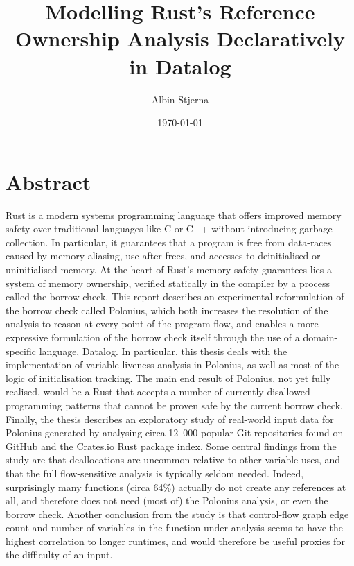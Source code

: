 \documentclass[11pt,a4paper,twoside,openany]{report}
\author{Albin Stjerna}
\date{\today}
\title{Modelling Rust's Reference Ownership Analysis Declaratively in Datalog}
\begin{document}



\maketitle

\section*{Abstract}

Rust is a modern systems programming language that offers improved memory safety
over traditional languages like C or C++ without introducing garbage collection.
In particular, it guarantees that a program is free from data-races caused by
memory-aliasing, use-after-frees, and accesses to deinitialised or uninitialised
memory. At the heart of Rust's memory safety guarantees lies a system of memory
ownership, verified statically in the compiler by a process called the borrow
check. This report describes an experimental reformulation of the borrow check
called Polonius, which both increases the resolution of the analysis to reason
at every point of the program flow, and enables a more expressive formulation of
the borrow check itself through the use of a domain-specific language, Datalog.
In particular, this thesis deals with the implementation of variable liveness
analysis in Polonius, as well as most of the logic of initialisation tracking.
The main end result of Polonius, not yet fully realised, would be a Rust that
accepts a number of currently disallowed programming patterns that cannot be
proven safe by the current borrow check. Finally, the thesis describes an
exploratory study of real-world input data for Polonius generated by analysing
circa 12~000 popular Git repositories found on GitHub and the Crates.io Rust
package index. Some central findings from the study are that deallocations are
uncommon relative to other variable uses, and that the full flow-sensitive
analysis is typically seldom needed. Indeed, surprisingly many functions (circa
64\%) actually do not create any references at all, and therefore does not need
(most of) the Polonius analysis, or even the borrow check. Another conclusion
from the study is that control-flow graph edge count and number of variables in
the function under analysis seems to have the highest correlation to longer
runtimes, and would therefore be useful proxies for the difficulty of an input.
\end{document}
